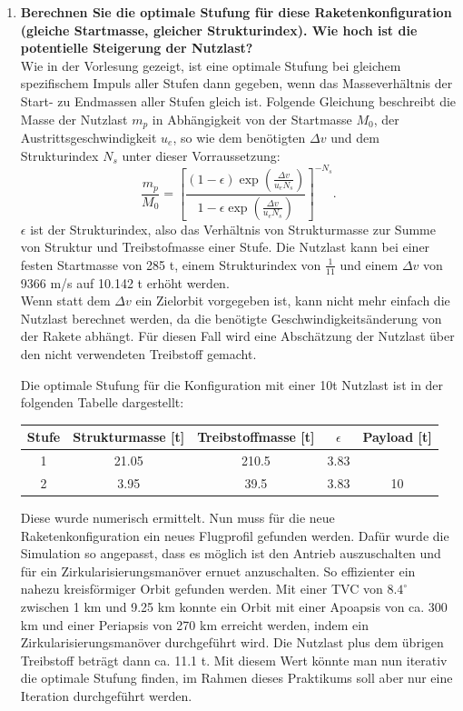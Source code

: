 \documentclass[12pt]{article}
\begin{document}
\begin{enumerate}
    \item \textbf{Berechnen Sie die optimale Stufung für diese Raketenkonfiguration (gleiche Startmasse, gleicher Strukturindex). Wie hoch ist die potentielle Steigerung der Nutzlast?}\\
    
    Wie in der Vorlesung gezeigt, ist eine optimale Stufung bei gleichem spezifischem Impuls aller Stufen dann gegeben, wenn das Masseverhältnis der Start- zu Endmassen aller Stufen gleich ist. Folgende Gleichung beschreibt die Masse der Nutzlast $m_{p}$ in Abhängigkeit von der Startmasse $M_0$, der Austrittsgeschwindigkeit $u_e$, so wie dem benötigten $\Delta v$ und dem Strukturindex $N_s$ unter dieser Vorraussetzung:
    \begin{equation}
        \frac{m_p}{M_0} = \left[ \frac{(1-\epsilon) \exp{\left( \frac{\Delta v}{u_e N_s}\right) }}{1-\epsilon \exp{ \left(\frac{\Delta v}{u_e N_s}\right)}} \right]^{-N_s}.
    \end{equation}
    $\epsilon$ ist der Strukturindex, also das Verhältnis von Strukturmasse zur Summe von Struktur und Treibstofmasse einer Stufe. Die Nutzlast kann bei einer festen Startmasse von 285 t, einem Strukturindex von $\frac{1}{11}$ und einem $\Delta v$ von 9366 m/s auf 10.142 t erhöht werden. \\

    Wenn statt dem $\Delta v$ ein Zielorbit vorgegeben ist, kann nicht mehr einfach die Nutzlast berechnet werden, da die benötigte Geschwindigkeitsänderung von der Rakete abhängt. Für diesen Fall wird eine Abschätzung der Nutzlast über den nicht verwendeten Treibstoff gemacht.

    Die optimale Stufung für die Konfiguration mit einer 10t Nutzlast ist in der folgenden Tabelle dargestellt:
    \begin{center}
        \begin{tabular}{c | c | c | c | c}
            Stufe & Strukturmasse [t] & Treibstoffmasse [t] & $\epsilon$ & Payload [t] \\
            \midrule
            1 & 21.05 & 210.5 & 3.83 &  \\
            2 & 3.95 & 39.5 & 3.83 & 10 \\
        \end{tabular}
    \end{center}
    Diese wurde numerisch ermittelt. Nun muss für die neue Raketenkonfiguration ein neues Flugprofil gefunden werden. Dafür wurde die Simulation so angepasst, dass es möglich ist den Antrieb auszuschalten und für ein Zirkularisierungsmanöver ernuet anzuschalten. So effizienter ein nahezu kreisförmiger Orbit gefunden werden. Mit einer TVC von $8.4 ^\circ$ zwischen 1 km und 9.25 km konnte ein Orbit mit einer Apoapsis von ca. 300 km und einer Periapsis von 270 km erreicht werden, indem ein Zirkularisierungsmanöver durchgeführt wird. Die Nutzlast plus dem übrigen Treibstoff beträgt dann ca. 11.1 t. Mit diesem Wert könnte man nun iterativ die optimale Stufung finden, im Rahmen dieses Praktikums soll aber nur eine Iteration durchgeführt werden.
    


\end{enumerate}
\end{document}

